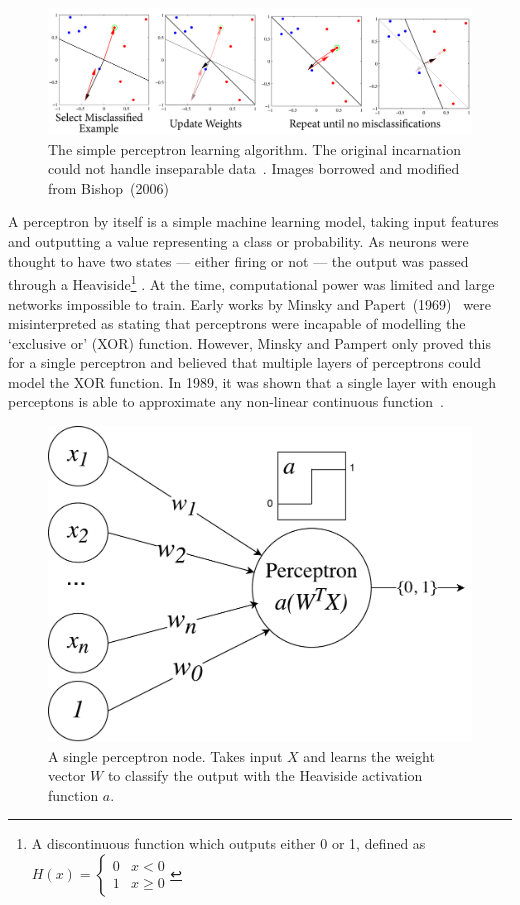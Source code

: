 \documentclass[12pt, twoside]{book}
\renewcommand\emph[1]{\textit{\color{USred}{#1}}}
\begin{document}
\begin{figure}[h]
\label{perceptron}
\centering\includegraphics[width=1\linewidth]{perceptron.png}
\caption{The simple perceptron learning algorithm. The original incarnation could not handle inseparable data~\cite{rosenblatt1958perceptron}. Images borrowed and modified from Bishop~(2006)~\cite{prml} }
\end{figure}

A perceptron by itself is a simple machine learning model, taking input features  and outputting a value representing a class or probability. As neurons were thought to have two states --- either firing or not --- the output was passed through a Heaviside\footnote{A discontinuous function which outputs either 0 or 1, defined as $ H(x)=\begin{cases} 
      0 & x < 0 \\
      1 & x \geq 0 
   \end{cases}
$} \emph{activation function}. At the time, computational power was limited and large networks impossible to train. Early works by Minsky and Papert~(1969)~\cite{minsky1969perceptrons} were misinterpreted as stating that perceptrons were incapable of modelling the `exclusive or' (XOR) function. However, Minsky and Pampert only proved this for a single perceptron and believed that multiple layers of perceptrons could model the XOR function. In 1989, it was shown that a single layer with enough perceptons is able to approximate any non-linear continuous function~\cite{nnuniversalapprox}.


\begin{figure}[h]
\label{perceptronvis}
\centering\includegraphics[width=0.5\linewidth]{perceptron.pdf}
\caption{A single perceptron node. Takes input $X$ and learns the weight vector $W$ to classify the output with the Heaviside activation function $a$.}
\end{figure}
\end{document}
